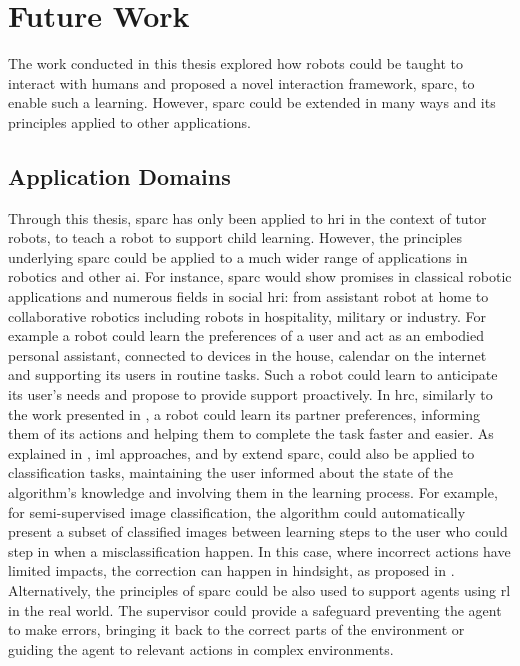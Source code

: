 \section{Future Work}


The work conducted in this thesis explored how robots could be taught to interact with humans and proposed a novel interaction framework, \gls{sparc}, to enable such a learning. However, \gls{sparc} could be extended in many ways and its principles applied to other applications.

\subsection{Application Domains}

Through this thesis, \gls{sparc} has only been applied to \gls{hri} in the context of tutor robots, to teach a robot to support child learning. However, the principles underlying \gls{sparc} could be applied to a much wider range of applications in robotics and other \gls{ai}. For instance, \gls{sparc} would show promises in classical robotic applications and numerous fields in social \gls{hri}: from assistant robot at home to collaborative robotics including robots in hospitality, military or industry. For example a robot could learn the preferences of a user and act as an embodied personal assistant, connected to devices in the house, calendar on the internet and supporting its users in routine tasks. Such a robot could learn to anticipate its user's needs and propose to provide support proactively. In \gls{hrc}, similarly to the work presented in \cite{munzer2017efficient}, a robot could learn its partner preferences, informing them of its actions and helping them to complete the task faster and easier. As explained in \cite{fails2003interactive}, \gls{iml} approaches, and by extend \gls{sparc}, could also be applied to classification tasks, maintaining the user informed about the state of the algorithm's knowledge and involving them in the learning process. For example, for semi-supervised image classification, the algorithm could automatically present a subset of classified images between learning steps to the user who could step in when a misclassification happen. In this case, where incorrect actions have limited impacts, the correction can happen in hindsight, as proposed in \cite{chernova2009interactive}. Alternatively, the principles of \gls{sparc} could be also used to support agents using \gls{rl} in the real world. The supervisor could provide a safeguard preventing the agent to make errors, bringing it back to the correct parts of the environment or guiding the agent to relevant actions in complex environments.

